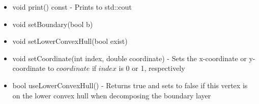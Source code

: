 \documentclass[manuscript, screen]{acmart}
\begin{document}
\begin{itemize}
\item void print() const - Prints to std::cout

\item void setBoundary(bool b)

\item void setLowerConvexHull(bool exist)

\item void setCoordinate(int index, double coordinate) - Sets the x-coordinate or y-coordinate to $coordinate$ if $index$ is 0 or 1, respectively

\item bool useLowerConvexHull() - Returns true and sets to false if this vertex is on the lower convex hull when decomposing the boundary layer
\end{itemize}
\end{document}
